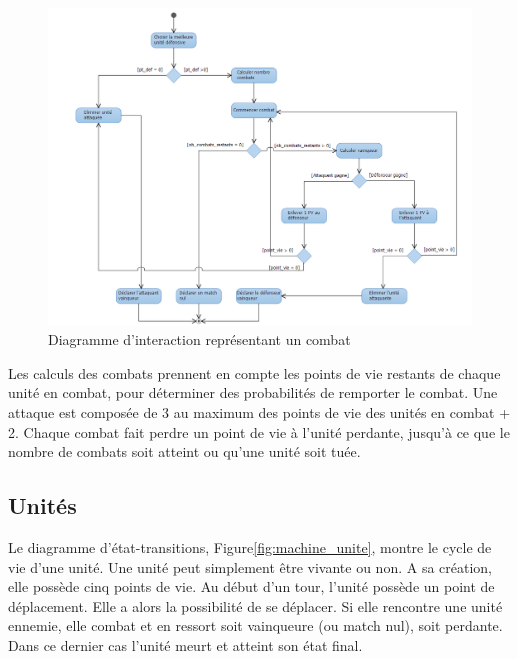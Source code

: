 \documentclass[a4paper]{article}
\begin{document}
\begin{figure}[ht]
\centering
	\includegraphics[width=1\textwidth, height=0.4\textheight]{../Schemas/Interaction_Combat.png}
		\caption{Diagramme d'interaction représentant un combat}
		\label{fig:interaction_combat}
\end{figure}

Les calculs des combats prennent en compte les points de vie restants de chaque unité en combat, pour déterminer des probabilités de remporter le combat. Une attaque est composée de 3 au maximum des points de vie des unités en combat + 2. Chaque combat fait perdre un point de vie à l'unité perdante, jusqu'à ce que le nombre de combats soit atteint ou qu'une unité soit tuée.

\clearpage
	\subsection{Unités}
Le diagramme d'état-transitions, Figure\ref{fig:machine_unite}, montre le cycle de vie d'une unité. Une unité peut simplement être vivante ou non.
A sa création, elle possède cinq points de vie.
Au début d'un tour, l'unité possède un point de déplacement. Elle a alors la possibilité de se déplacer. Si elle rencontre une unité ennemie, elle combat et en ressort soit vainqueure (ou match nul), soit perdante. Dans ce dernier cas l'unité meurt et atteint son état final.
\end{document}
